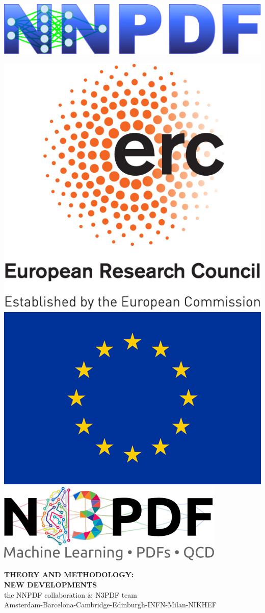\documentclass[a4,landscape]{seminar}
\newcommand{\1}{1\!\!\!1}
\begin{document}
\renewcommand{\labelitemii}{\textrm{--}}
%
%


\begin{slide}
  \begin{minipage}{.47\linewidth}
\begin{flushleft}\includegraphics[width=.48\linewidth,clip]{nnpdf_logo_official.pdf}\end{flushleft}
\end{minipage}
\begin{minipage}{.47\linewidth}\begin{flushright}
\includegraphics[width=.16\linewidth,clip]{LOGO-ERC.jpg}
\includegraphics[width=.22\linewidth,clip]{flag_yellow_low.jpg}
\includegraphics[width=.51\linewidth,clip]{n3pdflogo_noback.png}
\end{flushright}\end{minipage}
\renewcommand{\slidestretch}{.8}
\begin{center}
\vspace{.6cm}
 {\bf\huge {\red THEORY AND METHODOLOGY:}}\\
\vspace{.4cm}
 {\bf\huge\darkgreen NEW DEVELOPMENTS}\\
\vspace{1. cm}
{\Large {\blue the NNPDF collaboration \& N3PDF team}\\
 {\small Amsterdam-Barcelona-Cambridge-Edinburgh-INFN-Milan-NIKHEF}
}

\end{center}
\end{slide}
\end{document}
